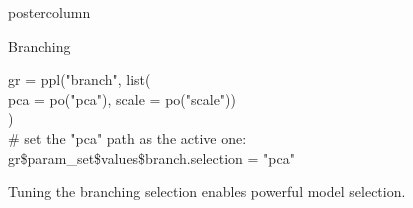 \documentclass{beamer}
\newlength{\columnheight} %
\newcommand{\codeinline}[1]{\begin{codeboxinline}#1\end{codeboxinline}}
\begin{document}
\begin{frame}[fragile]{}
\begin{columns}
\begin{column}{.245\textwidth}
\begin{beamercolorbox}[center]{postercolumn}
\begin{minipage}{.98\textwidth}
{\begin{myblock}{Branching}
\begin{codeboxexample}[- Preprocessing]
                {\footnotesize
                gr = ppl("branch", list(\\
                \hspace*{1ex} pca = po("pca"), scale = po("scale"))\\
                )\\
                \# set the "pca" path as the active one:\\
                gr\$param\_set\$values\$branch.selection = "pca"}
              \end{codeboxexample}
              \vspace{1.0em}
              Tuning the branching selection enables powerful model selection.
            \end{myblock}
            \vspace{-1.0em}
            \vfill}
        \end{minipage}
      \end{beamercolorbox}
    \end{column}
  \end{columns}
\end{frame}
\end{document}
